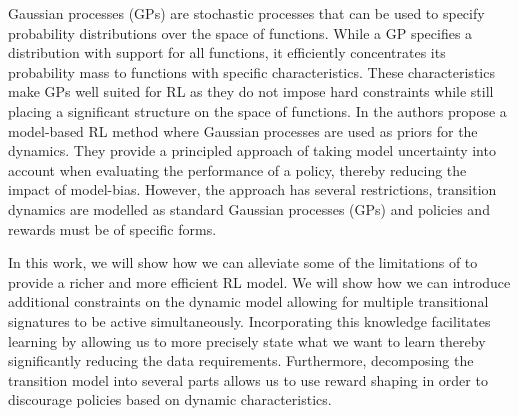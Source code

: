 Gaussian processes (GPs) are stochastic processes that can be used to specify probability distributions over the space of functions.
While a GP specifies a distribution with support for all functions, it efficiently concentrates its probability mass to functions with specific characteristics.
These characteristics make GPs well suited for RL as they do not impose hard constraints while still placing a significant structure on the space of functions.
In \parencite{deisenroth_pilco_2011} the authors propose a model-based RL method where Gaussian processes are used as priors for the dynamics.
They provide a principled approach of taking model uncertainty into account when evaluating the performance of a policy, thereby reducing the impact of model-bias.
However, the approach has several restrictions, transition dynamics are modelled as standard Gaussian processes (GPs) and policies and rewards must be of specific forms.

In this work, we will show how we can alleviate some of the limitations of \parencite{deisenroth_pilco_2011} to provide a richer and more efficient RL model.
We will show how we can introduce additional constraints on the dynamic model allowing for multiple transitional signatures to be active simultaneously.
Incorporating this knowledge facilitates learning by allowing us to more precisely state what we want to learn thereby significantly reducing the data requirements.
Furthermore, decomposing the transition model into several parts allows us to use reward shaping \parencite{sutton_reinforcement_2018} in order to discourage policies based on dynamic characteristics.

